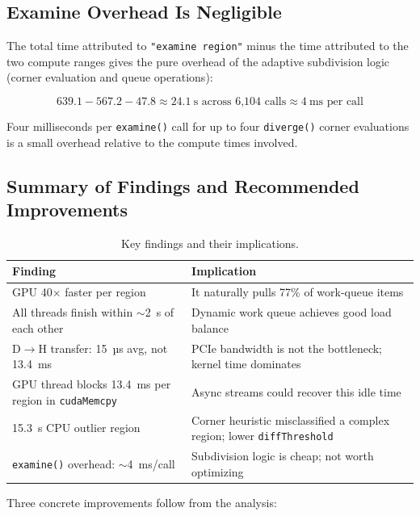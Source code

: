 \documentclass[
	english,
	letterpaper, oneside
]{article}
\begin{document}
\subsection{Examine Overhead Is Negligible}

The total time attributed to \texttt{"examine region"} minus the time
attributed to the two compute ranges gives the pure overhead of the
adaptive subdivision logic (corner evaluation and queue operations):

\[
    639.1 - 567.2 - 47.8 \approx 24.1~\text{s across 6{,}104 calls}
    \approx 4~\text{ms per call}
\]

Four milliseconds per \texttt{examine()} call for up to four
\texttt{diverge()} corner evaluations is a small overhead relative to the
compute times involved.

\subsection{Summary of Findings and Recommended Improvements}

\begin{table}[H]
    \centering
    \caption{Key findings and their implications.}
    \begin{tabular}{p{5.5cm} p{7cm}}
        \hline
        Finding & Implication \\
        \hline
        GPU 40$\times$ faster per region &
            It naturally pulls 77\% of work-queue items \\
        All threads finish within $\sim$2~s of each other &
            Dynamic work queue achieves good load balance \\
        D$\rightarrow$H transfer: 15~µs avg, not 13.4~ms &
            PCIe bandwidth is not the bottleneck; kernel time dominates \\
        GPU thread blocks 13.4~ms per region in \texttt{cudaMemcpy} &
            Async streams could recover this idle time \\
        15.3~s CPU outlier region &
            Corner heuristic misclassified a complex region; lower \texttt{diffThreshold} \\
        \texttt{examine()} overhead: $\sim$4~ms/call &
            Subdivision logic is cheap; not worth optimizing \\
        \hline
    \end{tabular}
\end{table}

Three concrete improvements follow from the analysis:
\end{document}
